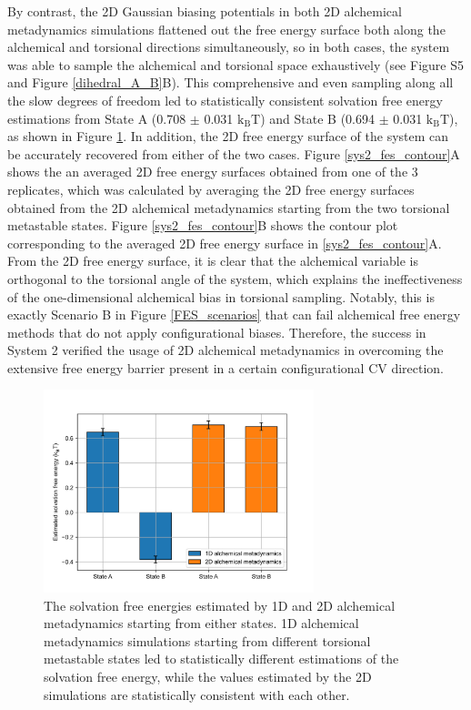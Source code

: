 \documentclass[journal=jacsat,manuscript=article]{achemso}
\begin{document}
By contrast, the 2D Gaussian biasing potentials in both 2D alchemical metadynamics simulations flattened out the free energy surface both along the alchemical and torsional directions simultaneously, so in both cases, the system was able to sample the alchemical and torsional space exhaustively (see Figure S5 and Figure \ref{dihedral_A_B}B). This comprehensive and even sampling along all the slow degrees of freedom led to statistically consistent solvation free energy estimations from State A (0.708 $\pm$ 0.031 $\text{k}_{\text{B}}\text{T}$) and State B (0.694 $\pm$ 0.031 $\text{k}_{\text{B}}\text{T}$), as shown in Figure \ref{sys2_df_results}. In addition, the 2D free energy surface of the system can be accurately recovered from either of the two cases. Figure \ref{sys2_fes_contour}A shows the an averaged 2D free energy surfaces obtained from one of the 3 replicates, which was calculated by averaging the 2D free energy surfaces obtained from the 2D alchemical metadynamics starting from the two torsional metastable states. Figure \ref{sys2_fes_contour}B shows the contour plot corresponding to the averaged 2D free energy surface in \ref{sys2_fes_contour}A. From the 2D free energy surface, it is clear that the alchemical variable is orthogonal to the torsional angle of the system, which explains the ineffectiveness of the one-dimensional alchemical bias in torsional sampling. Notably, this is exactly Scenario B in Figure \ref{FES_scenarios} that can fail alchemical free energy methods that do not apply configurational biases. Therefore, the success in System 2 verified the usage of 2D alchemical metadynamics in overcoming the extensive free energy barrier present in a certain configurational CV direction. 

\begin{figure}[H]
    \centering
    \includegraphics[width=0.7\textwidth]{Figures/sys2_df_results.png}
    \caption{The solvation free energies estimated by 1D and 2D alchemical metadynamics starting from either states. 1D alchemical metadynamics simulations starting from different torsional metastable states led to statistically different estimations of the solvation free energy, while the values estimated by the 2D simulations are statistically consistent with each other.}
    \label{sys2_df_results}
\end{figure}
\end{document}
